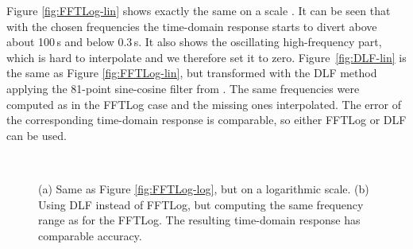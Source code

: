 \documentclass[extra, camera,%
    onecolumn,   %
    referee,     %
]{gji}
\newlength{\fwidth}
\begin{document}
Figure \ref{fig:FFTLog-lin} shows exactly the same on a
 scale . It can be seen that with
the chosen frequencies  the time-domain
response starts to divert above about 100\,s and below 0.3\,s. It also shows
the oscillating high-frequency part, which is hard to interpolate and we
therefore set it to zero. Figure~\ref{fig:DLF-lin} is the same as Figure
\ref{fig:FFTLog-lin}, but transformed with the DLF method applying the 81-point
sine-cosine filter from \cite{GEO.09.Key}. The same frequencies were computed
as in the FFTLog case and the missing ones interpolated. The error of the
corresponding time-domain response is comparable, so either FFTLog or DLF can
be used.
%
\begin{figure}
  \centering
  \hfill
  \\
  \caption{(a) Same as Figure \ref{fig:FFTLog-log}, but on a logarithmic
  scale. (b) Using DLF instead of FFTLog, but computing the same frequency
  range as for the FFTLog. The resulting time-domain response has comparable
  accuracy.}
  \label{fig:lin-lin}
\end{figure}
\end{document}
